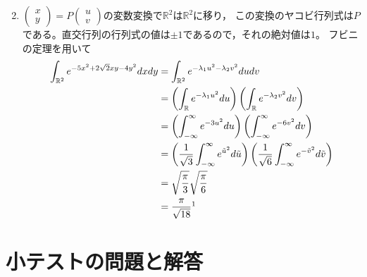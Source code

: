 \documentclass[dvipdfmx,a4j,10pt]{jsarticle}
\makeatletter
\theoremstyle{mystyle1}
\theoremstyle{mystyle2}
\newtheorem{ans}{解答}
\renewenvironment{ans}[1][解答]{\par
  \pushQED{\qed}%
  \normalfont
  \topsep6\p@\@plus6\p@ \trivlist
  \item[\hskip\labelsep{\bfseries\sffamily #1}]\ignorespaces
}{%
  \popQED\endtrivlist\@endpefalse
}
\makeatother
\begin{document}
\begin{ans}
\begin{enumerate}
\[        \]
        \item $\begin{pmatrix} x \\ y \end{pmatrix}=P\begin{pmatrix} u \\ v \end{pmatrix}$の変数変換\footnotemark で$\mathbb{R}^2$は$\mathbb{R}^2$に移り，
        この変換のヤコビ行列式は$P$である。直交行列の行列式の値は$\pm 1$であるので，それの絶対値は$1$\footnotemark。
        フビニの定理を用いて
        \[
        \begin{split}
            \int_{\mathbb{R}^2} e^{-5x^2+2\sqrt{2}xy-4y^2}dxdy
            &= \int_{\mathbb{R}^2} e^{-\lambda_1 u^2-\lambda_2 v^2}dudv\\
            &= \left(\int_{\mathbb{R}} e^{-\lambda_1 u^2}du\right)\left(\int_{\mathbb{R}} e^{-\lambda_2 v^2}dv\right)\\
            &= \left(\int_{-\infty}^\infty e^{-3 u^2}du\right)\left(\int_{-\infty}^\infty e^{-6 v^2}dv\right)\\
            &= \left(\frac{1}{\sqrt{3}}\int_{-\infty}^\infty e^{\tilde{u}^2}d\tilde{u}\right)\left(\frac{1}{\sqrt{6}}\int_{-\infty}^\infty e^{-\tilde{v}^2}d\tilde{v}\right)\\
            &=\sqrt{\frac{\pi}{3}}\sqrt{\frac{\pi}{6}}\\
            &=\frac{\pi}{\sqrt{18}}\footnotemark
        \end{split}
        \]
    \end{enumerate}
\end{ans}

\newpage
\part{小テストの問題と解答}
\end{document}
